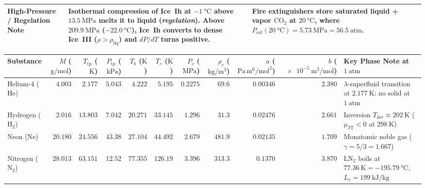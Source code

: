 \begin{center}
\begin{tabularx}{\linewidth}{@{}l X X@{}}
\textbf{High-Pressure / Regelation Note} & Isothermal compression of Ice~Ih at $-\SI{1}{\celsius}$ above $\SI{13.5}{\mega\pascal}$ melts it to liquid (\emph{regelation}). Above $\SI{209.9}{\mega\pascal}$ ($-\SI{22.0}{\celsius}$), Ice~Ih converts to dense Ice~III ($\rho > \rho_{\mathrm{liq}}$) and $dP/dT$ turns positive. & Fire extinguishers store saturated liquid + vapor $\mathrm{CO_2}$ at $\SI{20}{\celsius}$, where $P_{\mathrm{sat}}(\SI{20}{\celsius}) = \SI{5.73}{\mega\pascal} = \SI{56.5}{\text{atm}}$. \\\bottomrule
\end{tabularx}
\end{center}

\begin{center}
\label{tab:05:triplecrit}
\scriptsize\setlength{\tabcolsep}{3.0pt}\renewcommand{\arraystretch}{1.08}
\begin{tabularx}{\linewidth}{@{}l r r r r r r r r r X@{}}\toprule
\textbf{Substance} & \textbf{$M$ ($\si{\gram\per\mole}$)} & \textbf{$T_{\mathrm{tp}}$ ($\si{\kelvin}$)} & \textbf{$P_{\mathrm{tp}}$ ($\si{\kilo\pascal}$)} & \textbf{$T_b$ ($\si{\kelvin}$)} & \textbf{$T_c$ ($\si{\kelvin}$)} & \textbf{$P_c$ ($\si{\mega\pascal}$)} & \textbf{$\rho_c$ ($\si{\kilogram\per\cubic\meter}$)} & \textbf{$a$ ($\mathrm{Pa\,m^6/mol^2}$)} & \textbf{$b$ ($\SI{e-5}{\cubic\meter\per\mole}$)} & \textbf{Key Phase Note at $\SI{1}{\text{atm}}$} \\\midrule
Helium-4 ($\mathrm{He}$) & $4.003$ & $2.177$ & $5.043$ & $4.222$ & $5.195$ & $0.2275$ & $69.6$ & $0.00346$ & $2.380$ & $\lambda$-superfluid transition at $\SI{2.177}{\kelvin}$; no solid at $\SI{1}{\text{atm}}$ \\
Hydrogen ($\mathrm{H_2}$) & $2.016$ & $13.803$ & $7.042$ & $20.271$ & $33.145$ & $1.296$ & $31.3$ & $0.02476$ & $2.661$ & Inversion $T_{\mathrm{inv}} \approx \SI{202}{\kelvin}$ ($\mu_{\mathrm{JT}} < 0$ at $\SI{298}{\kelvin}$) \\
Neon ($\mathrm{Ne}$) & $20.180$ & $24.556$ & $43.38$ & $27.104$ & $44.492$ & $2.679$ & $481.9$ & $0.02135$ & $1.709$ & Monatomic noble gas ($\gamma = 5/3 = 1.667$) \\
Nitrogen ($\mathrm{N_2}$) & $28.013$ & $63.151$ & $12.52$ & $77.355$ & $126.19$ & $3.396$ & $313.3$ & $0.1370$ & $3.870$ & $\mathrm{LN_2}$ boils at $\SI{77.36}{\kelvin} = -\SI{195.79}{\celsius}$, $L_v = \SI{199}{\kilo\joule\per\kilogram}$ \\

\end{tabularx}
\end{center}
